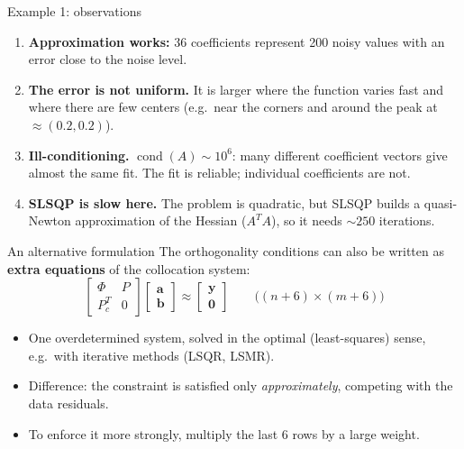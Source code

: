 \documentclass[10pt,aspectratio=169]{beamer}
\newcommand{\hl}[1]{\textcolor{accent}{\textbf{#1}}}
\begin{document}
\begin{frame}{Example 1: observations}
  \begin{enumerate}
    \item \textbf{Approximation works:} 36 coefficients represent 200 noisy
          values with an error close to the noise level.
    \item \textbf{The error is not uniform.} It is larger where the function
          varies fast and where there are few centers (e.g.\ near the
          corners and around the peak at $\approx(0.2,0.2)$).
    \item \textbf{Ill-conditioning.} $\operatorname{cond}(A)\sim 10^6$: many
          different coefficient vectors give almost the same fit. The fit
          is reliable; individual coefficients are not.
    \item \textbf{SLSQP is slow here.} The problem is quadratic, but SLSQP
          builds a quasi-Newton approximation of the Hessian ($A^TA$), so it
          needs $\sim 250$ iterations.
  \end{enumerate}
\end{frame}

\begin{frame}{An alternative formulation}
  The orthogonality conditions can also be written as \hl{extra equations}
  of the collocation system:
  \[
    \begin{bmatrix} \Phi & P \\ P_c^T & 0 \end{bmatrix}
    \begin{bmatrix} \bm{a} \\ \bm{b} \end{bmatrix}
    \approx
    \begin{bmatrix} \bm{y} \\ \bm{0} \end{bmatrix}
    \qquad \big((n+6)\times(m+6)\big)
  \]
  \begin{itemize}
    \item One overdetermined system, solved in the optimal (least-squares)
          sense, e.g.\ with iterative methods (LSQR, LSMR).
    \item Difference: the constraint is satisfied only
          \emph{approximately}, competing with the data residuals.
    \item To enforce it more strongly, multiply the last 6 rows by a large
          weight.
  \end{itemize}
\end{frame}
\end{document}
